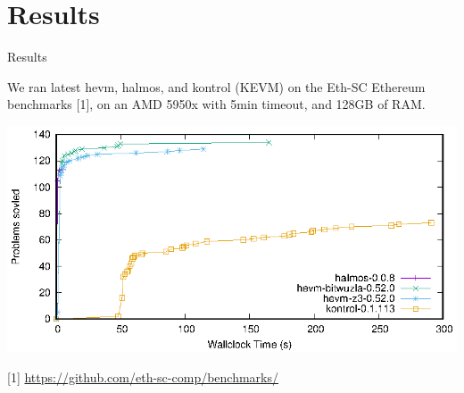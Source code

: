 \documentclass[aspectratio=169]{beamer}
\begin{document}
%


%
%
%
%
%
%

\section{Results}

\begin{frame}[fragile=singleslide]{Results}

We ran latest hevm, halmos, and kontrol (KEVM) on the Eth-SC Ethereum benchmarks [1], on an AMD 5950x with 5min timeout,  and 128GB of RAM.
{
\begin{center}
\includegraphics{cdf}
\end{center}
}

[1] \qquad  \url{https://github.com/eth-sc-comp/benchmarks/}
\end{frame}
\end{document}
